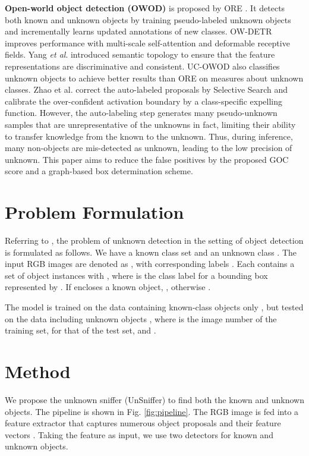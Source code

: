 \documentclass[10pt,twocolumn,letterpaper]{article}
\begin{document}
\noindent
\textbf{Open-world object detection (OWOD)} is proposed by ORE \cite{owod}.
It detects both known and unknown objects by training pseudo-labeled unknown objects and incrementally learns updated annotations of new classes.
OW-DETR \cite{OWDETR} improves performance with multi-scale self-attention and deformable receptive fields. Yang \emph{et al}. \cite{yang2021objects} introduced semantic topology to ensure that the feature representations are discriminative and consistent.
UC-OWOD \cite{wu2022uc} also classifies unknown objects to achieve better results than ORE on measures about unknown classes.
Zhao et al. \cite{rowod} correct the auto-labeled proposals by Selective Search and calibrate the over-confident activation boundary by a class-specific expelling function.
However, the auto-labeling step generates many pseudo-unknown samples that are unrepresentative of the unknowns in fact,
limiting their ability to transfer knowledge from the known to the unknown.
Thus, during inference, many non-objects are mis-detected as unknown,
leading to the low precision of unknown.
This paper aims to reduce the false positives by the proposed GOC score and a graph-based box determination scheme.


\section{Problem Formulation}


Referring to \cite{vos},
the problem of unknown detection in the setting of object detection is formulated as follows.
We have a known class set  and an unknown class .
The  input RGB images are denoted as ,
with corresponding labels .
Each  contains a set of object instances with ,
where  is the class label for a bounding box represented by .
If  encloses a known object, , otherwise .

The model is trained on the data containing known-class objects only ,
but tested on the data including unknown objects ,
where  is the image number of the training set,
 for that of the test set,
and .


\section{Method}
\label{sec:method}

We propose the unknown sniffer (UnSniffer) to find both the known and unknown objects.
The pipeline is shown in Fig. \ref{fig:pipeline}.
The RGB image 
is fed into a feature extractor \cite{ren2015faster} that captures numerous object proposals  and their feature vectors .
Taking the feature  as input,
we use two detectors for known and unknown objects. 
\end{document}
